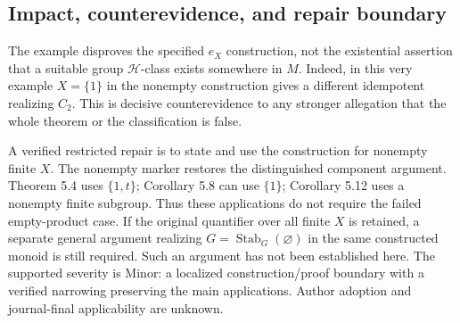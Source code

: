 \documentclass[10pt]{article}
\begin{document}
\subsection*{Impact, counterevidence, and repair boundary}
The example disproves the specified \(e_X\) construction, not the existential assertion that a suitable group \(\mathcal H\)-class exists somewhere in \(M\). Indeed, in this very example \(X=\{1\}\) in the nonempty construction gives a different idempotent realizing \(C_2\). This is decisive counterevidence to any stronger allegation that the whole theorem or the classification is false.\par
A verified restricted repair is to state and use the construction for nonempty finite \(X\). The nonempty marker restores the distinguished component argument. Theorem 5.4 uses \(\{1,t\}\); Corollary 5.8 can use \(\{1\}\); Corollary 5.12 uses a nonempty finite subgroup. Thus these applications do not require the failed empty-product case. If the original quantifier over all finite \(X\) is retained, a separate general argument realizing \(G=\operatorname{Stab}_G(\varnothing)\) in the same constructed monoid is still required. Such an argument has not been established here. The supported severity is Minor: a localized construction/proof boundary with a verified narrowing preserving the main applications. Author adoption and journal-final applicability are unknown.\par
\end{document}
